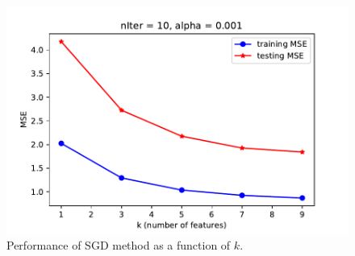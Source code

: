 \documentclass[twoside,11pt]{homework}
\begin{document}
%
\begin{figure}[ht]
\centering
\includegraphics[]{kTest.pdf}
\caption{Performance of SGD method as a function of $k$.}
\label{Fk}
\end{figure}
%
\end{document}
